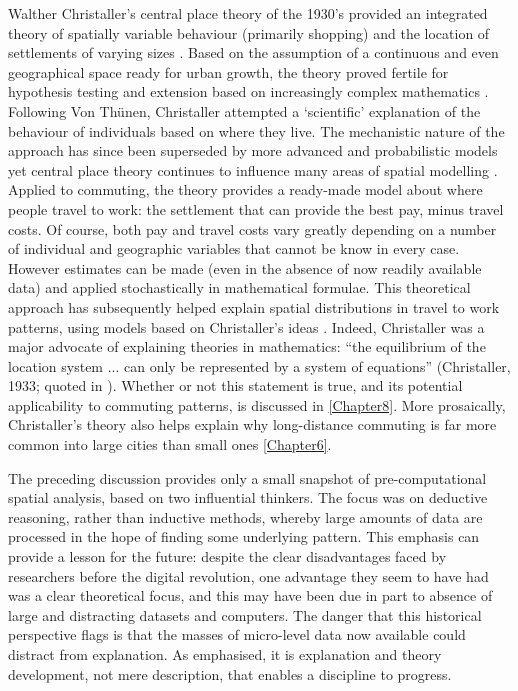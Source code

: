 Walther Christaller's central place theory of the 1930's provided an integrated
theory of spatially variable behaviour (primarily shopping) and the location of
settlements of varying sizes \citep{matthews2008geography}. Based on the
assumption of a continuous and even geographical space ready for urban growth,
the theory proved fertile for hypothesis testing and extension based on
increasingly complex mathematics . Following Von Th\"{u}nen, Christaller
attempted a `scientific' explanation of the behaviour of individuals based on
where they live. The mechanistic nature of the approach has since been
superseded by more advanced and probabilistic models
yet central place theory continues to influence
many areas of spatial modelling \citep{Wilson1972-theoretical, Sonis2005,
Farooq2012-integreted}. Applied to commuting, the theory provides a ready-made
model about where people travel to work: the settlement that can provide the
best pay, minus travel costs. Of course, both pay and travel costs vary greatly
depending on a number of individual and geographic variables that cannot be know
in every case. However estimates can be made (even in the absence of now
readily available data) and applied stochastically in mathematical
formulae. This theoretical approach has subsequently helped
explain spatial distributions in travel to work patterns, using models based on
Christaller's ideas \citep{Tabuchi2006-commuting-costs}. Indeed, Christaller was
a major advocate of explaining theories in
mathematics: ``the equilibrium of the location system ... can only be
represented by a system of equations'' (Christaller, 1933; quoted in
\citealp[p.~35]{Wilson1972-theoretical}). Whether or not this statement is true,
and its potential applicability to commuting patterns, is discussed in
\cref{Chapter8}. More prosaically, Christaller's theory also helps explain why
long-distance commuting is far more common into large cities than small ones
\cref{Chapter6}.

The preceding discussion provides only a small snapshot of pre-computational
spatial analysis, based on two influential thinkers. The
focus was on deductive reasoning, rather than inductive methods, whereby large
amounts of data are processed in the hope of finding some underlying pattern.
This emphasis can provide a lesson for the future: despite the clear
disadvantages faced by researchers before the digital revolution, one
advantage they seem to have had was a clear theoretical focus, and this may
have been due in part to absence of large and distracting datasets and
computers.
The danger that this historical perspective flags is that the masses of
micro-level data now available could distract from explanation. As
\citet{Wilson1972-theoretical} emphasised, it is explanation and theory
development, not mere description, that enables a discipline to progress. 

